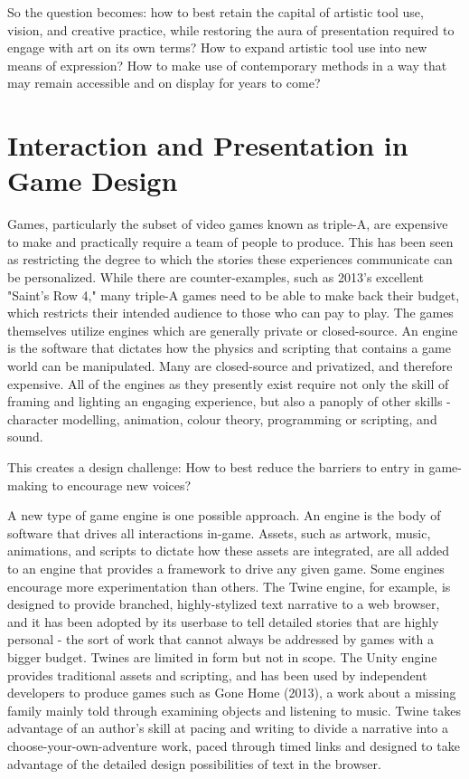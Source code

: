 So the question becomes: how to best retain the capital of artistic tool use, vision, and creative practice, while restoring the aura of presentation required to engage with art on its own terms? How to expand artistic tool use into new means of expression? How to make use of contemporary methods in a way that may remain accessible and on display for years to come? 

\section{Interaction and Presentation in Game Design}

Games, particularly the subset of video games known as triple-A, are expensive to make and practically require a team of people to produce. This has been seen as restricting the degree to which the stories these experiences communicate can be personalized. While there are counter-examples, such as 2013's excellent "Saint's Row 4," many triple-A games need to be able to make back their budget, which restricts their intended audience to those who can pay to play. The games themselves utilize engines which are generally private or closed-source. An engine is the software that dictates how the physics and scripting that contains a game world can be manipulated. Many are closed-source and privatized, and therefore expensive. All of the engines as they presently exist require not only the skill of framing and lighting an engaging experience, but also a panoply of other skills - character modelling, animation, colour theory, programming or scripting, and sound.

This creates a design challenge: How to best reduce the barriers to entry in game-making to encourage new voices?

A new type of game engine is one possible approach. An engine is the body of software that drives all interactions in-game. Assets, such as artwork, music, animations, and scripts to dictate how these assets are integrated, are all added to an engine that provides a framework to drive any given game. Some engines encourage more experimentation than others. The Twine engine, for example, is designed to provide branched, highly-stylized text narrative to a web browser, and it has been adopted by its userbase to tell detailed stories that are highly personal - the sort of work that cannot always be addressed by games with a bigger budget. Twines are limited in form but not in scope. The Unity engine provides traditional assets and scripting, and has been used by independent developers to produce games such as Gone Home (2013), a work about a missing family mainly told through examining objects and listening to music. Twine takes advantage of an author's skill at pacing and writing to divide a narrative into a choose-your-own-adventure work, paced through timed links and designed to take advantage of the detailed design possibilities of text in the browser.

